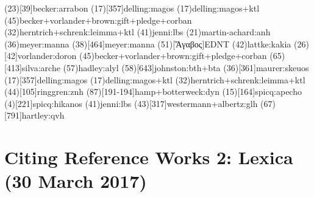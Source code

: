 \documentclass[a4paper]{article}
\begin{document}
\examplecite(23)[39]{becker:arrabon}
\examplecite(17)[357]{delling:magos}
\examplecite(17){delling:magos+ktl}
\examplecite(45){becker+vorlander+brown:gift+pledge+corban}
\examplecite(32){herntrich+schrenk:leimma+ktl}
\examplecite(41){jenni:lbs}
\examplecite(21){martin-achard:anh}
\examplecite(36){meyer:manna}
\examplecite(38)[464]{meyer:manna}
\examplecite(51)[Ἅγαβος]{EDNT}
\examplecite(42){lattke:kakia}
\examplecite(26)[42]{vorlander:doron}
\examplecite[afull](45){becker+vorlander+brown:gift+pledge+corban}
\examplecite(65)[413]{silva:arche}
\examplecite(57){hadley:alyl}
\examplecite(58)[643]{johnston:bth+bta}
\examplecite(36)[361]{maurer:skeuos}
\examplecite[afull](17)[357]{delling:magos}
\examplecite[afull](17){delling:magos+ktl}
\examplecite[afull](32){herntrich+schrenk:leimma+ktl}
\examplecite(44)[105]{ringgren:znh}
\examplecite(87)[191-194]{hamp+botterweck:dyn}
\examplecite(15)[164]{spicq:apecho}
\examplecite(4)[221]{spicq:hikanos}
\examplecite[full](41){jenni:lbs}
\examplecite(43)[317]{westermann+albertz:glh}
\examplecite(67)[791]{hartley:qvh}
\begin{verbcite}
  \nocite{THAT, ThWAT, TWNT}
\end{verbcite}
\exampleabbreviations
\examplebibliography
{}

\section{Citing Reference Works 2: Lexica (30 March 2017)}
\end{document}
